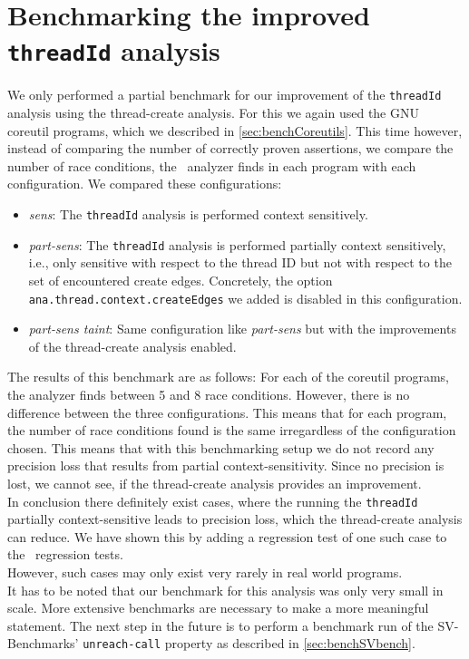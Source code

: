   \section{Benchmarking the improved \texttt{threadId} analysis}
    We only performed a partial benchmark for our improvement of the \texttt{threadId} analysis using the thread-create analysis. For this we again used the GNU coreutil programs, which we described in \autoref{sec:benchCoreutils}. This time however, instead of comparing the number of correctly proven assertions, we compare the number of race conditions, the \gob\ analyzer finds in each program with each configuration. We compared these configurations:
    \begin{itemize}
      \item \textit{sens}: The \texttt{threadId} analysis is performed context sensitively.
      \item \textit{part-sens}: The \texttt{threadId} analysis is performed partially context sensitively, i.e., only sensitive with respect to the thread ID but not with respect to the set of encountered create edges. Concretely, the option \texttt{ana.thread.context.createEdges} we added is disabled in this configuration.
      \item \textit{part-sens taint}: Same configuration like \textit{part-sens} but with the improvements of the thread-create analysis enabled.
    \end{itemize}
    The results of this benchmark are as follows: For each of the coreutil programs, the analyzer finds between 5 and 8 race conditions. However, there is no difference between the three configurations. This means that for each program, the number of race conditions found is the same irregardless of the configuration chosen. This means that with this benchmarking setup we do not record any precision loss that results from partial context-sensitivity. Since no precision is lost, we cannot see, if the thread-create analysis provides an improvement.
    \\
    In conclusion there definitely exist cases, where the running the \texttt{threadId} partially context-sensitive leads to precision loss, which the thread-create analysis can reduce. We have shown this by adding a regression test of one such case to the \gob\ regression tests.\\
    However, such cases may only exist very rarely in real world programs.\\
    It has to be noted that our benchmark for this analysis was only very small in scale. More extensive benchmarks are necessary to make a more meaningful statement. The next step in the future is to perform a benchmark run of the SV-Benchmarks' \texttt{unreach-call} property as described in \autoref{sec:benchSVbench}.
